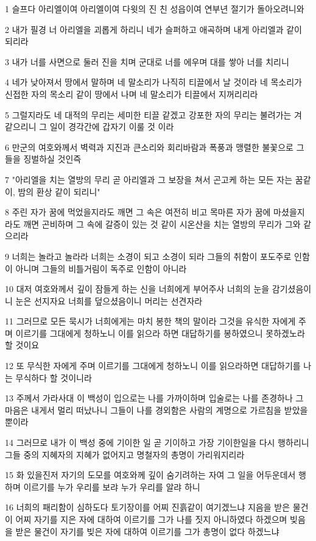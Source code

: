 \par 1 슬프다 아리엘이여 아리엘이여 다윗의 진 친 성읍이여 연부년 절기가 돌아오려니와
\par 2 내가 필경 너 아리엘을 괴롭게 하리니 네가 슬퍼하고 애곡하며 내게 아리엘과 같이 되리라
\par 3 내가 너를 사면으로 둘러 진을 치며 군대로 너를 에우며 대를 쌓아 너를 치리니
\par 4 네가 낮아져서 땅에서 말하며 네 말소리가 나직히 티끌에서 날 것이라 네 목소리가 신접한 자의 목소리 같이 땅에서 나며 네 말소리가 티끌에서 지꺼리리라
\par 5 그럴지라도 네 대적의 무리는 세미한 티끌 같겠고 강포한 자의 무리는 불려가는 겨 같으리니 그 일이 경각간에 갑자기 이룰 것 이라
\par 6 만군의 여호와께서 벽력과 지진과 큰소리와 회리바람과 폭풍과 맹렬한 불꽃으로 그들을 징벌하실 것인즉
\par 7 "아리엘을 치는 열방의 무리 곧 아리엘과 그 보장을 쳐서 곤고케 하는 모든 자는 꿈같이, 밤의 환상 같이 되리니"
\par 8 주린 자가 꿈에 먹었을지라도 깨면 그 속은 여전히 비고 목마른 자가 꿈에 마셨을지라도 깨면 곤비하며 그 속에 갈증이 있는 것 같이 시온산을 치는 열방의 무리가 그와 같으리라
\par 9 너희는 놀라고 놀라라 너희는 소경이 되고 소경이 되라 그들의 취함이 포도주로 인함이 아니며 그들의 비틀거림이 독주로 인함이 아니라
\par 10 대저 여호와께서 깊이 잠들게 하는 신을 너희에게 부어주사 너희의 눈을 감기셨음이니 눈은 선지자요 너희를 덮으셨음이니 머리는 선견자라
\par 11 그러므로 모든 묵시가 너희에게는 마치 봉한 책의 말이라 그것을 유식한 자에게 주며 이르기를 그대에게 청하노니 이를 읽으라 하면 대답하기를 봉하였으니 못하겠노라 할 것이요
\par 12 또 무식한 자에게 주며 이르기를 그대에게 청하노니 이를 읽으라하면 대답하기를 나는 무식하다 할 것이니라
\par 13 주께서 가라사대 이 백성이 입으로는 나를 가까이하며 입술로는 나를 존경하나 그 마음은 내게서 멀리 떠났나니 그들이 나를 경외함은 사람의 계명으로 가르침을 받았을 뿐이라
\par 14 그러므로 내가 이 백성 중에 기이한 일 곧 기이하고 가장 기이한일을 다시 행하리니 그들 중의 지혜자의 지혜가 없어지고 명철자의 총명이 가리워지리라
\par 15 화 있을진저 자기의 도모를 여호와께 깊이 숨기려하는 자여 그 일을 어두운데서 행하며 이르기를 누가 우리를 보랴 누가 우리를 알랴 하니
\par 16 너희의 패리함이 심하도다 토기장이를 어찌 진흙같이 여기겠느냐 지음을 받은 물건이 어찌 자기를 지은 자에 대하여 이르기를 그가 나를 짓지 아니하였다 하겠으며 빚음을 받은 물건이 자기를 빚은 자에 대하여 이르기를 그가 총명이 없다 하겠느냐
